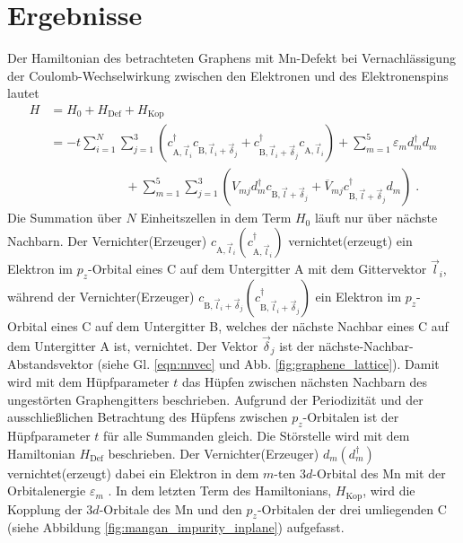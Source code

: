\chapter{Ergebnisse}
\label{chap:berechnung}
Der Hamiltonian des betrachteten Graphens mit Mn-Defekt bei Vernachlässigung der Coulomb-Wechselwirkung zwischen den Elektronen und des Elektronenspins lautet
\begin{equation}
    \begin{aligned}
   H &=  H_0 + H_\text{Def} + H_\text{Kop}\\
    &= - t  \sum_{i=1}^N \sum_{j=1}^3
    \left ( c_{\text{A},\vec{l}_i}^\dagger c_{\text{B},\vec{l}_i+\vec{\delta}_j} + c_{\text{B},\vec{l}_i+\vec{\delta}_j}^\dagger c_{\text{A},\vec{l}_i} \right )  + \sum_{m=1}^5 \varepsilon_m d_m^\dagger d_m \\
    & \quad \quad \quad \quad \quad \quad+ \sum_{m=1}^5 \sum_{j=1}^3 \left ( V_{mj} d_m^\dagger c_{\text{B},\vec{l}+\vec{\delta}_j} + \overline{V}_{mj} c_{\text{B},\vec{l}+\vec{\delta}_j}^\dagger d_m \right )  \; \text{.} \label{eqn:full_Hamiltonian}
    \end{aligned}
\end{equation}
Die Summation über $N$ Einheitszellen in dem Term $H_0$ läuft nur über nächste Nachbarn.
Der Vernichter(Erzeuger) $c_{\text{A},\vec{l}_i}(c_{\text{A},\vec{l}_i}^{\dagger})$ vernichtet(erzeugt) ein Elektron im $p_z$-Orbital 
eines C auf dem Untergitter A mit dem Gittervektor $\vec{l}_i$, während der Vernichter(Erzeuger)
$c_{\text{B},\vec{l}_i+\vec{\delta}_j}(c_{\text{B},\vec{l}_i+\vec{\delta}_j}^{\dagger})$
ein Elektron im $p_z$-Orbital eines C auf dem Untergitter B, welches der nächste Nachbar eines C auf dem Untergitter A ist, vernichtet.
Der Vektor $\vec{\delta}_j$ ist der nächste-Nachbar-Abstandsvektor (siehe Gl. \eqref{eqn:nnvec} und Abb. \ref{fig:graphene_lattice}).
Damit wird mit dem Hüpfparameter $t$ das Hüpfen zwischen nächsten Nachbarn des ungestörten Graphengitters beschrieben.
Aufgrund der Periodizität und der ausschließlichen Betrachtung des Hüpfens zwischen $p_z$-Orbitalen ist der  
Hüpfparameter $t$ für alle Summanden gleich.   
Die Störstelle wird mit dem Hamiltonian $H_\text{Def}$ beschrieben. 
Der Vernichter(Erzeuger) $d_m(d_m^{\dagger})$ vernichtet(erzeugt) dabei ein Elektron in dem $m$-ten $3d$-Orbital des Mn mit der 
Orbitalenergie $\varepsilon_m$ \cite{anders-fkt}.
In dem letzten Term des Hamiltonians, $H_\text{Kop}$, wird die Kopplung der $3d$-Orbitale des Mn und 
den $p_z$-Orbitalen der drei umliegenden C (siehe Abbildung \ref{fig:mangan_impurity_inplane}) aufgefasst.
